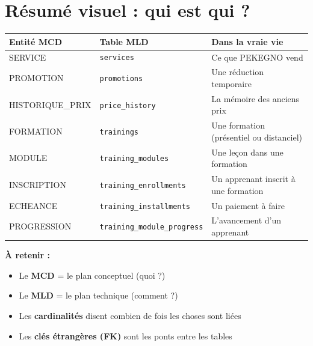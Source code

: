 \documentclass[12pt,a4paper]{article}
\begin{document}
\section{Résumé visuel : qui est qui ?}

\noindent\begin{tabularx}{\textwidth}{l l X}
    \toprule
    \textbf{Entité MCD} & \textbf{Table MLD} & \textbf{Dans la vraie vie} \\
    \midrule
    SERVICE & \texttt{services} & Ce que PEKEGNO vend \\
    PROMOTION & \texttt{promotions} & Une réduction temporaire \\
    HISTORIQUE\_PRIX & \texttt{price\_history} & La mémoire des anciens prix \\
    FORMATION & \texttt{trainings} & Une formation (présentiel ou distanciel) \\
    MODULE & \texttt{training\_modules} & Une leçon dans une formation \\
    INSCRIPTION & \texttt{training\_enrollments} & Un apprenant inscrit à une formation \\
    ECHEANCE & \texttt{training\_installments} & Un paiement à faire \\
    PROGRESSION & \texttt{training\_module\_progress} & L'avancement d'un apprenant \\
    \bottomrule
\end{tabularx}

\vspace{12pt}

\begin{resume}
    \textbf{À retenir :}
    \begin{itemize}
        \item Le \textbf{MCD} = le plan conceptuel (quoi ?)
        \item Le \textbf{MLD} = le plan technique (comment ?)
        \item Les \textbf{cardinalités} disent combien de fois les choses sont liées
        \item Les \textbf{clés étrangères (FK)} sont les ponts entre les tables
    \end{itemize}
\end{resume}
\end{document}
